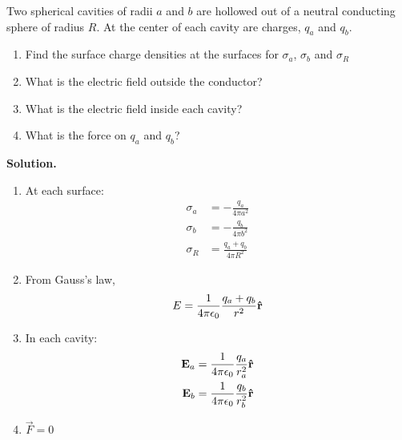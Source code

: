 \documentclass[a4paper]{article}
\begin{document}
\begin{eg}
	Two spherical cavities of radii $a$ and $b$ are hollowed out of a
	neutral conducting sphere of radius $R$. At the center of each cavity
	are charges, $q_a$ and $q_b$.
	\begin{enumerate}
		\item Find the surface charge densities at the surfaces for
			$\sigma_a$, $\sigma_b$ and $\sigma_R$
		\item What is the electric field outside the conductor?
		\item What is the electric field inside each cavity?
		\item What is the force on $q_a$ and $q_b$?
	\end{enumerate}
	\textbf{Solution.}
	\begin{enumerate}
		\item At each surface:
		\begin{align*}
			\sigma_a &= -\frac{q_a}{4\pi a^2}\\
			\sigma_b &= -\frac{q_b}{4\pi b^2}\\
			\sigma_R &= \frac{q_a + q_b}{4\pi R^2}
		\end{align*}
		\item From Gauss's law,
		\[ E = \frac{1}{4\pi\epsilon_0}\frac{q_a+q_b}{r^2}\boldsymbol{\mathbf{\hat{r}}} \]
		\item In each cavity:
		\begin{align*}
			\boldsymbol{\mathbf{E}}_a &=
			\frac{1}{4\pi\epsilon_0}\frac{q_a}{r_a^2}\boldsymbol{\mathbf{\hat{r}}}\\
			\boldsymbol{\mathbf{E}}_b &=
			\frac{1}{4\pi\epsilon_0}\frac{q_b}{r_b^2}\boldsymbol{\mathbf{\hat{r}}}\\
		\end{align*}
		\item $\vec{F} = 0$
	\end{enumerate}
\end{eg}
\end{document}
